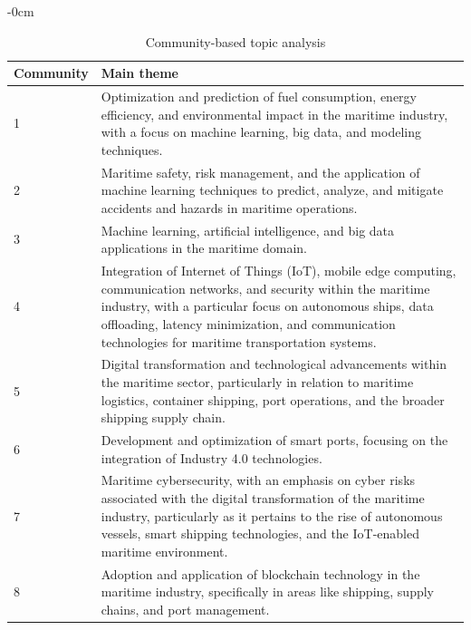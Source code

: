 \documentclass[jmse,review,submit,pdftex,moreauthors]{Definitions/mdpi}
\begin{document}
\begin{adjustwidth}{-\extralength}{0cm}
\begin{table}[H]
	\centering
	\caption{Community-based topic analysis}
	\begin{tabularx}{\linewidth}{p{2cm}X}
		\hline
		Community & Main theme \\
		\hline
		1 & Optimization and prediction of fuel consumption, energy efficiency, and environmental impact in the maritime industry, with a focus on machine learning, big data, and modeling techniques.\\
		2 & Maritime safety, risk management, and the application of machine learning techniques to predict, analyze, and mitigate accidents and hazards in maritime operations. \\
		3 & Machine learning, artificial intelligence, and big data applications in the maritime domain.\\
		4 & Integration of Internet of Things (IoT), mobile edge computing, communication networks, and security within the maritime industry, with a particular focus on autonomous ships, data offloading, latency minimization, and communication technologies for maritime transportation systems.\\
		5 & Digital transformation and technological advancements within the maritime sector, particularly in relation to maritime logistics, container shipping, port operations, and the broader shipping supply chain.\\
		6 & Development and optimization of smart ports, focusing on the integration of Industry 4.0 technologies.\\
		7 & Maritime cybersecurity, with an emphasis on cyber risks associated with the digital transformation of the maritime industry, particularly as it pertains to the rise of autonomous vessels, smart shipping technologies, and the IoT-enabled maritime environment.\\
		8 & Adoption and application of blockchain technology in the maritime industry, specifically in areas like shipping, supply chains, and port management.\\
		\hline
	\end{tabularx}
	\label{tab:citationthemes}
\end{table}


\end{adjustwidth}
\end{document}
